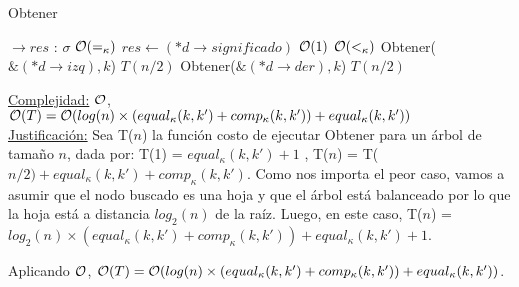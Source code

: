 \begin{Algoritmos}
\begin{algorithm}
\caption{Obtener}
\begin{algorithmic}[1]
$\to res$ : \texttt{$\sigma$}	
	\Comment $\mathcal{O}(=_{\kappa})$
		\State $res\gets (*d\to significado)$
		\Comment $\mathcal{O}(1)$
	\Else
		\Comment $\mathcal{O}(<_{\kappa})$
			\State Obtener($\&(*d\to izq), k$)	
			\Comment $T(n/2)$	
		\Else
			\State Obtener($\&(*d\to der), k$)
			\Comment $T(n/2)$
		\EndIf
	\EndIf

\EndProcedure
\end{algorithmic}
\underline{Complejidad:} $\mathcal{O}$, $\mathcal{O}(T) = \mathcal{O}(log(n) \times (equal_{\kappa}(k, k') + comp_{\kappa}(k, k')) + equal_{\kappa}(k, k'))$ \\
\underline{Justificación:} Sea T($n$) la función costo de ejecutar Obtener para un árbol de tamaño $n$, dada por: T(1) = $equal_{\kappa}(k, k') + 1$ , T($n$) = T($n/2) + equal_{\kappa}(k, k') + comp_{\kappa}(k, k')$. Como nos importa el peor caso, vamos a asumir que el nodo buscado es una hoja y que el árbol está balanceado por lo que la hoja está a distancia $log_2(n)$ de la raíz. Luego, en este caso, T($n$) = $log_2(n) \times (equal_{\kappa}(k, k') + comp_{\kappa}(k, k')) + equal_{\kappa}(k, k') + 1$. 

Aplicando $\mathcal{O}$, $\mathcal{O}(T) = \mathcal{O}(log(n) \times (equal_{\kappa}(k, k') + comp_{\kappa}(k, k')) + equal_{\kappa}(k, k'))$.
\end{algorithm}


\end{Algoritmos}
